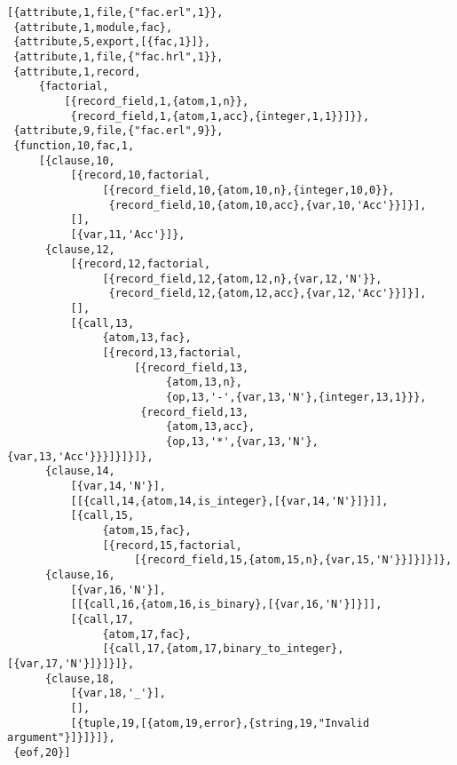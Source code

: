 \begin{lstlisting}[style=erlang, caption=Drzewo syntaktyczne modułu fac, label=facAE]
[{attribute,1,file,{"fac.erl",1}},
 {attribute,1,module,fac},
 {attribute,5,export,[{fac,1}]},
 {attribute,1,file,{"fac.hrl",1}},
 {attribute,1,record,
     {factorial,
         [{record_field,1,{atom,1,n}},
          {record_field,1,{atom,1,acc},{integer,1,1}}]}},
 {attribute,9,file,{"fac.erl",9}},
 {function,10,fac,1,
     [{clause,10,
          [{record,10,factorial,
               [{record_field,10,{atom,10,n},{integer,10,0}},
                {record_field,10,{atom,10,acc},{var,10,'Acc'}}]}],
          [],
          [{var,11,'Acc'}]},
      {clause,12,
          [{record,12,factorial,
               [{record_field,12,{atom,12,n},{var,12,'N'}},
                {record_field,12,{atom,12,acc},{var,12,'Acc'}}]}],
          [],
          [{call,13,
               {atom,13,fac},
               [{record,13,factorial,
                    [{record_field,13,
                         {atom,13,n},
                         {op,13,'-',{var,13,'N'},{integer,13,1}}},
                     {record_field,13,
                         {atom,13,acc},
                         {op,13,'*',{var,13,'N'},{var,13,'Acc'}}}]}]}]},
      {clause,14,
          [{var,14,'N'}],
          [[{call,14,{atom,14,is_integer},[{var,14,'N'}]}]],
          [{call,15,
               {atom,15,fac},
               [{record,15,factorial,
                    [{record_field,15,{atom,15,n},{var,15,'N'}}]}]}]},
      {clause,16,
          [{var,16,'N'}],
          [[{call,16,{atom,16,is_binary},[{var,16,'N'}]}]],
          [{call,17,
               {atom,17,fac},
               [{call,17,{atom,17,binary_to_integer},[{var,17,'N'}]}]}]},
      {clause,18,
          [{var,18,'_'}],
          [],
          [{tuple,19,[{atom,19,error},{string,19,"Invalid argument"}]}]}]},
 {eof,20}]
\end{lstlisting}
